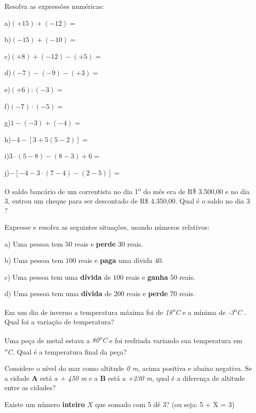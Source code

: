 \begin{exercicios}

	\exitem{} Resolva as expressões numéricas:
    \begin{multicols}{2}
        a)$(+15)+(-12) =$
        
        b)$(-15)+(-10) =$

        c)$(+8)+(-12)-(+5) =$
        
        d)$(-7)-(-9)-(+3) =$

        e)$(+6) : (-3) =$
        
        f)$(-7) \cdot (-5) =$

        g)$1- (-3)+(-4)=$
        
        h)$-4-[3+5(5 - 2)]=$

        i)$3\cdot(5 - 8)-(8 - 3)+6 =$
        
        j)$-[-4 -3\cdot(7-4)-(2-5)]=$
    \end{multicols}
	\exitem{} O saldo bancário de um correntista no dia 1\textsuperscript{o }do mês era de R$\$$  3.500,00 e no dia 3, entrou um cheque para ser descontado de R$\$$  4.350,00. Qual é o saldo no dia 3 ?

	\exitem{} Expresse e resolva as seguintes situações, usando números relativos:

    \quad a) Uma pessoa tem $50$ reais e \textbf{perde} $30$ reais.

    \quad b) Uma pessoa tem $100$ reais e \textbf{paga} uma dívida $40$.

    \quad c) Uma pessoa tem uma \textbf{dívida} de $100$ reais e \textbf{ganha} $50$ reais.

    \quad d) Uma pessoa tem uma \textbf{dívida} de $200$ reais e \textbf{perde} $70$ reais.

	\exitem{} Em um dia de inverno a temperatura máxima foi de \textit{18\textsuperscript{o}C} e a mínima de \textit{-3\textsuperscript{o}C} . Qual foi a variação de temperatura?

	\exitem{} Uma peça de metal estava a \textit{80\textsuperscript{o}C }e foi resfriada variando sua temperatura em\textit{ \textsuperscript{o}C. }Qual é a temperatura final da peça?

	\exitem{} Considere o nível do mar como altitude \textit{0 m}, acima positiva e abaixo negativa. Se a cidade \textbf{A} está a \textit{+ 450 m} e a \textbf{B} está a \textit{+230 m}, qual é a diferença de altitude \quad entre as cidades?

	\exitem{} Existe um número \textbf{inteiro} $X$ que somado com 5 dê 3? (ou seja: 5 + X = 3)


\end{exercicios}
